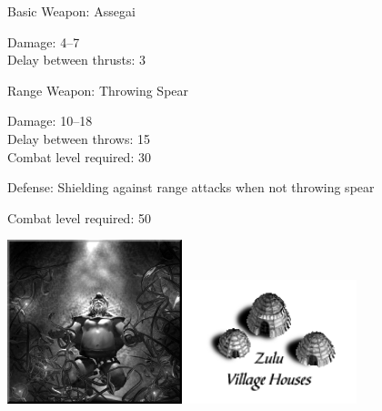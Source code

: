 Basic Weapon: Assegai
\begin{adjustwidth}{1cm}{}
	Damage: 4–7 \\
	Delay between thrusts: 3
\end{adjustwidth}
Range Weapon: Throwing Spear
\begin{adjustwidth}{1cm}{}
	Damage: 10–18 \\
	Delay between throws: 15 \\
	Combat level required: 30
\end{adjustwidth}
Defense: Shielding against range attacks when not throwing spear
\begin{adjustwidth}{1cm}{}
	Combat level required: 50
\end{adjustwidth}

\begin{center}
	\includegraphics[width=2in]{Aoldone}\hspace{1pt}\includegraphics[width=2in]{Izuluhouse}
\end{center}